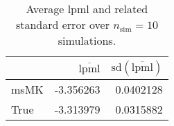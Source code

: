 \begin{table}[H]

\caption{Average lpml and related standard error over $n_{\text{sim}} = 10$ simulations.}
\centering
\begin{tabular}[t]{lrr}
\toprule
  & $\overbar{\text{lpml}}$ & $\text{sd}(\overbar{\text{lpml}})$\\
\midrule
msMK & -3.356263 & 0.0402128\\
True & -3.313979 & 0.0315882\\
\bottomrule
\end{tabular}
\end{table}